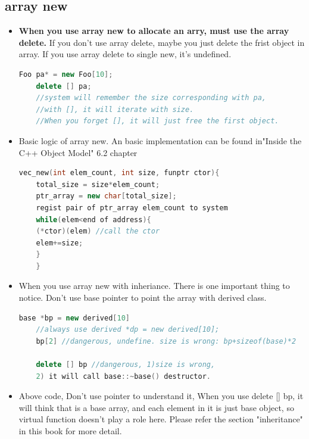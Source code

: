\documentclass[a4paper,11pt,twoside]{book}
\begin{document}
\subsection{array new}
\begin{itemize}
	\item \textbf{When you use array new to allocate an arry, must use the array delete.} If you don't use array delete, maybe you just delete the frist object in array. If you use array delete to single new, it's undefined. 
	\begin{lstlisting}[frame=single, language=c++]
	Foo pa* = new Foo[10];
	delete [] pa;
	//system will remember the size corresponding with pa, 
	//with [], it will iterate with size. 
	//When you forget [], it will just free the first object.
	\end{lstlisting}
	\item Basic logic of array new. An basic implementation can be found in"Inside the C++ Object Model" 6.2 chapter
	\begin{lstlisting}[frame=single, language=c++]
	vec_new(int elem_count, int size, funptr ctor){
	total_size = size*elem_count;
	ptr_array = new char[total_size];
	regist pair of ptr_array elem_count to system
	while(elem<end of address){
	(*ctor)(elem) //call the ctor
	elem+=size;
	}
	}
	\end{lstlisting}
	\item When you use array new with inheriance. There is one important thing to notice. Don't use base pointer to point the array with derived class. 
	\begin{lstlisting}[frame=single, language=c++]
	base *bp = new derived[10]
	//always use derived *dp = new derived[10];
	bp[2] //dangerous, undefine. size is wrong: bp+sizeof(base)*2
	
	delete [] bp //dangerous, 1)size is wrong, 
	2) it will call base::~base() destructor. 
	\end{lstlisting}
	\item Above code, Don't use pointer to understand it, When you use delete [] bp, it will think that is a base array, and each element in it is just base object, so virtual function doesn't play a role here. Please refer the section "inheritance" in this book for more detail.
\end{itemize}
\end{document}
